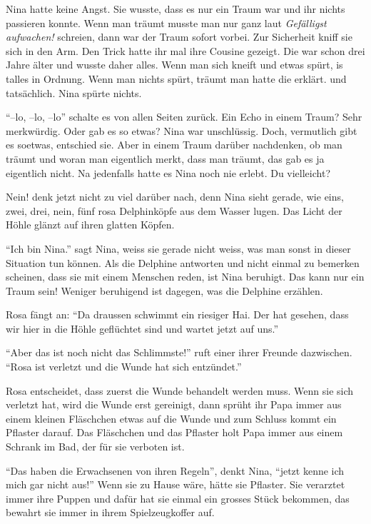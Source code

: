 Nina hatte keine Angst. Sie wusste, dass es nur ein Traum war und ihr nichts passieren konnte. Wenn man träumt musste man nur ganz laut {\it Gefälligst aufwachen!} schreien, dann war der Traum sofort vorbei. Zur Sicherheit kniff sie sich in den Arm. Den Trick hatte ihr mal ihre Cousine gezeigt. Die war schon drei Jahre älter und wusste daher alles. Wenn man sich kneift und etwas spürt, is talles in Ordnung. Wenn man nichts spürt, träumt man hatte die erklärt. und tatsächlich. Nina spürte nichts.


\enquote{--lo, --lo, --lo} schalte es von allen Seiten zurück. Ein Echo in einem Traum? Sehr merkwürdig. Oder gab es so etwas? Nina war unschlüssig. Doch, vermutlich gibt es soetwas, entschied sie. Aber in einem Traum darüber nachdenken, ob man träumt und woran man eigentlich merkt, dass man träumt, das gab es ja eigentlich nicht. Na jedenfalls hatte es Nina noch nie erlebt. Du vielleicht?

Nein! denk jetzt nicht zu viel darüber nach, denn Nina sieht gerade, wie eins, zwei, drei, nein, fünf rosa Delphinköpfe aus dem Wasser lugen. Das Licht der Höhle glänzt auf ihren glatten Köpfen. 

\enquote{Ich bin Nina.} sagt Nina, weiss sie gerade nicht weiss, was man sonst in dieser Situation tun können. Als die Delphine antworten und nicht einmal zu bemerken scheinen, dass sie mit einem Menschen reden, ist Nina beruhigt. Das kann nur ein Traum sein! Weniger beruhigend ist dagegen, was die Delphine erzählen.

Rosa fängt an: \enquote{Da draussen schwimmt ein riesiger Hai. Der hat gesehen, dass wir hier in die Höhle geflüchtet sind und wartet jetzt auf uns.}

\enquote{Aber das ist noch nicht das Schlimmste!} ruft einer ihrer Freunde dazwischen. \enquote{Rosa ist verletzt und die Wunde hat sich entzündet.}

Rosa entscheidet, dass zuerst die Wunde behandelt werden muss. Wenn sie sich verletzt hat, wird die Wunde erst gereinigt, dann sprüht ihr Papa immer aus einem kleinen Fläschchen etwas auf die Wunde und zum Schluss kommt ein Pflaster darauf. Das Fläschchen und das Pflaster holt Papa immer aus einem Schrank im Bad, der für sie verboten ist. 

\enquote{Das haben die Erwachsenen von ihren Regeln}, denkt Nina, \enquote{jetzt kenne ich mich gar nicht aus!} Wenn sie zu Hause wäre, hätte sie Pflaster. Sie verarztet immer ihre Puppen und dafür hat sie einmal ein grosses Stück bekommen, das bewahrt sie immer in ihrem Spielzeugkoffer auf.

